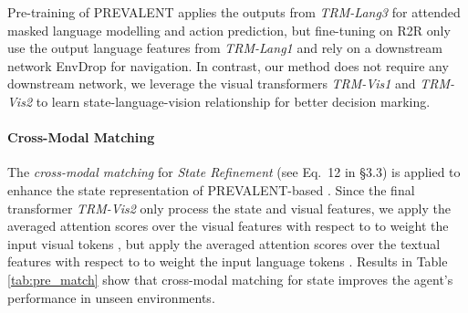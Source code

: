 \documentclass[final]{cvpr}
\begin{document}
Pre-training of PREVALENT \cite{hao2020towards} applies the outputs from \textit{TRM-Lang3} for attended masked language modelling and action prediction, but fine-tuning on R2R \cite{anderson2018vision} only use the output language features from \textit{TRM-Lang1} and rely on a downstream network EnvDrop \cite{tan2019learning} for navigation. In contrast, our method does not require any downstream network, we leverage the visual transformers \textit{TRM-Vis1} and \textit{TRM-Vis2} to learn state-language-vision relationship for better decision marking.

\paragraph{Cross-Modal Matching}
The \textit{cross-modal matching} for \textit{State Refinement} (see Eq.~12 in \S 3.3) is applied to enhance the state representation of PREVALENT-based \vlnbert. Since the final transformer \textit{TRM-Vis2} only process the state and visual features, we apply the averaged attention scores over the visual features with respect to  to weight the input visual tokens , but apply the averaged attention scores over the textual features with respect to  to weight the input language tokens . Results in Table \ref{tab:pre_match} show that cross-modal matching for state improves the agent's performance in unseen environments.

\begin{table}[hbt!]
    \begin{center}
    \end{center}
    \caption{Performance of PREVALENT-based \vlnbert~with and without cross-modal matching for agent's state.}
    \label{tab:pre_match}
\end{table}
\end{document}
